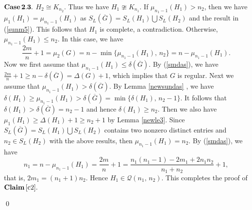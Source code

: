 \documentclass[12pt]{article}
\newenvironment{pf}{\medskip\noindent{Proof:  \hspace*{-.4cm}}
       \enspace}{\hfill \qed \newline \medskip}
\begin{document}
\begin{pf}
\noindent
${\bf Case\,2.3.}$ $H_2\cong K_{n_2}$. Thus we have $H_1\ncong K_{n_1}$. If $\mu_{n_1-1}(H_1)>n_2$, then we have
 $\mu_{1}(H_1)=\mu_{n_1-1}(H_1)$ as $S_L(\overline{G})=S_L(H_1)\bigcup S_L(H_2)$ and the result in (\ref{sunm5}).
 This follows that $H_1$ is complete, a contradiction. Otherwise, $\mu_{n_1-1}(H_1)\leq n_2$. In this case, we have
 \begin{equation}
 \frac{2m}{n}+1=\mu_2(G)=n-\min\{\mu_{n_1-1}(H_1),\,n_2\}=n-\mu_{n_1-1}(H_1).\label{smdas}
 \end{equation}
  Now we first assume that $\mu_{n_1-1}(H_1)\leq \delta(\overline{G})$. By (\ref{smdas}), we have
  $\frac{2m}{n}+1\geq n-\delta(\overline{G})=\Delta(G)+1$, which implies that $G$ is regular.
  Next we assume that $\mu_{n_1-1}(H_1)> \delta(\overline{G})$. By Lemma
  \ref{newsundas} , we have $\delta(H_1)\geq
  \mu_{n_1-1}(H_1)>\delta(\overline{G})=\min\{\delta(H_1),\,n_2-1\}$.
  It follows that $\delta(H_1)>\delta(\overline{G})=n_2-1$ and hence $\delta(H_1)\geq
  n_2$. Then we also have $\mu_1(H_1)\geq \Delta(H_1)+1\geq n_2+1$
  by Lemma \ref{newle3}. Since $S_L(\overline{G})=S_L(H_1)\bigcup
  S_L(H_2)$ contains two nonzero distinct entries and $n_2\in
  S_L(H_2)$ with the above results, then $\mu_{n_1-1}(H_1)=n_2$. By (\ref{smdas}), we have
  $$n_1=n- \mu_{n_1-1}(H_1)=\frac{2m}{n}+1=\frac{n_1(n_1-1)-2m_1+2n_1n_2}{n_1+n_2}+1,$$
  that is, $2m_1=(n_1+1)n_2$. Hence $H_1\in \mathcal{Q}(n_1,\,n_2)$.
  This completes the proof of  ${\bf Claim\,\ref{c2}.}$

\vspace*{3mm}


\end{pf}
\end{document}
